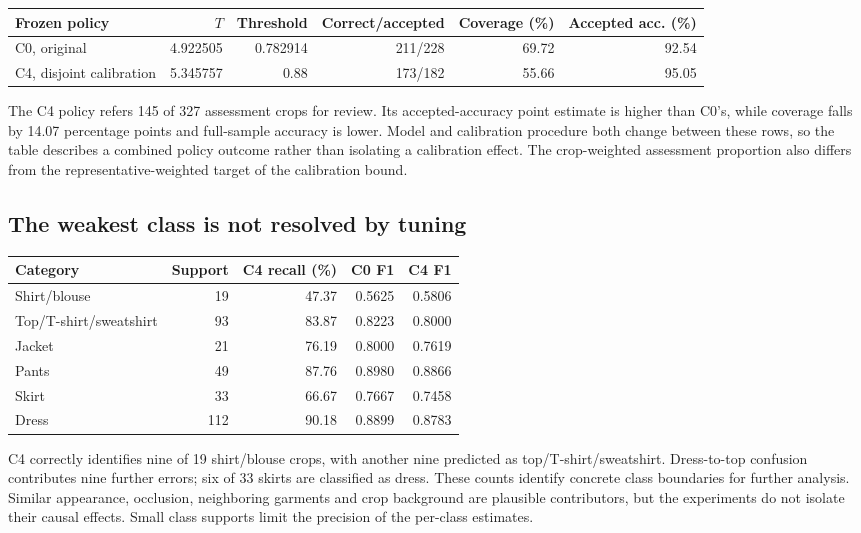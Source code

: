 \begin{center}\small
\begin{tabular}{lrrrrr}\toprule
Frozen policy & $T$ & Threshold & Correct/accepted & Coverage (\%) & Accepted acc. (\%)\\\midrule
C0, original & 4.922505 & 0.782914 & 211/228 & 69.72 & 92.54\\
C4, disjoint calibration & 5.345757 & 0.88 & 173/182 & 55.66 & 95.05\\\bottomrule
\end{tabular}\end{center}
The C4 policy refers 145 of 327 assessment crops for review. Its accepted-accuracy point estimate is higher than C0's, while coverage falls by 14.07 percentage points and full-sample accuracy is lower. Model and calibration procedure both change between these rows, so the table describes a combined policy outcome rather than isolating a calibration effect. The crop-weighted assessment proportion also differs from the representative-weighted target of the calibration bound.

\subsection{The weakest class is not resolved by tuning}
\begin{center}\small
\begin{tabular}{lrrrr}\toprule
Category & Support & C4 recall (\%) & C0 F1 & C4 F1\\\midrule
Shirt/blouse & 19 & 47.37 & 0.5625 & 0.5806\\
Top/T-shirt/sweatshirt & 93 & 83.87 & 0.8223 & 0.8000\\
Jacket & 21 & 76.19 & 0.8000 & 0.7619\\
Pants & 49 & 87.76 & 0.8980 & 0.8866\\
Skirt & 33 & 66.67 & 0.7667 & 0.7458\\
Dress & 112 & 90.18 & 0.8899 & 0.8783\\\bottomrule
\end{tabular}\end{center}
C4 correctly identifies nine of 19 shirt/blouse crops, with another nine predicted as top/T-shirt/sweatshirt. Dress-to-top confusion contributes nine further errors; six of 33 skirts are classified as dress. These counts identify concrete class boundaries for further analysis. Similar appearance, occlusion, neighboring garments and crop background are plausible contributors, but the experiments do not isolate their causal effects. Small class supports limit the precision of the per-class estimates.


